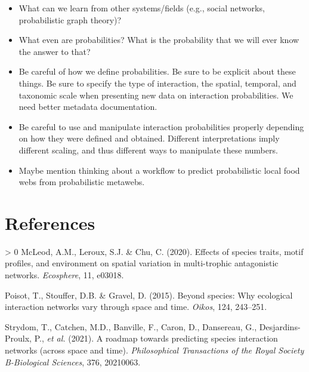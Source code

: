 \documentclass[10pt,oneside]{article}
\newlength{\cslhangindent}
\newenvironment{CSLReferences}[3] %
 {%
  \setlength{\parindent}{0pt}
  \ifodd #1 \everypar{\setlength{\hangindent}{\cslhangindent}}\ignorespaces\fi
  \ifnum #2 > 0
  \setlength{\parskip}{#2\baselineskip}
  \fi
 }%
 {}
\begin{document}
\begin{itemize}
\tightlist
\item
  What can we learn from other systems/fields (e.g., social networks,
  probabilistic graph theory)?
\item
  What even are probabilities? What is the probability that we will ever
  know the answer to that?
\item
  Be careful of how we define probabilities. Be sure to be explicit
  about these things. Be sure to specify the type of interaction, the
  spatial, temporal, and taxonomic scale when presenting new data on
  interaction probabilities. We need better metadata documentation.
\item
  Be careful to use and manipulate interaction probabilities properly
  depending on how they were defined and obtained. Different
  interpretations imply different scaling, and thus different ways to
  manipulate these numbers.
\item
  Maybe mention thinking about a workflow to predict probabilistic local
  food webs from probabilistic metawebs.
\end{itemize}

\hypertarget{references}{%
\section*{References}\label{references}}

\hypertarget{refs}{}
\begin{CSLReferences}{1}{0}
\leavevmode\hypertarget{ref-McLeod2020EffSpe}{}%
McLeod, A.M., Leroux, S.J. \& Chu, C. (2020). Effects of species traits,
motif profiles, and environment on spatial variation in multi-trophic
antagonistic networks. \emph{Ecosphere}, 11, e03018.

\leavevmode\hypertarget{ref-Poisot2015SpeWhy}{}%
Poisot, T., Stouffer, D.B. \& Gravel, D. (2015). Beyond species: Why
ecological interaction networks vary through space and time.
\emph{Oikos}, 124, 243--251.

\leavevmode\hypertarget{ref-Strydom2021RoaPre}{}%
Strydom, T., Catchen, M.D., Banville, F., Caron, D., Dansereau, G.,
Desjardins-Proulx, P., \emph{et al.} (2021). A roadmap towards
predicting species interaction networks (across space and time).
\emph{Philosophical Transactions of the Royal Society B-Biological
Sciences}, 376, 20210063.

\end{CSLReferences}
\end{document}
